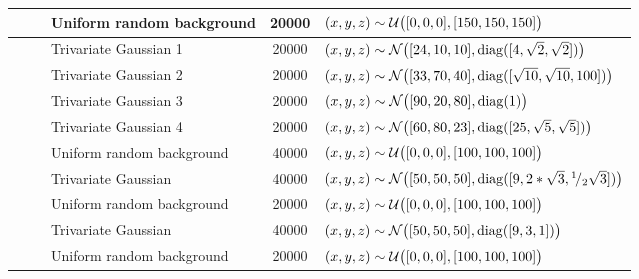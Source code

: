 \begin{tabular}{@{}cclS[table-format=+1.1e+1,scientific-notation=true,round-mode=places,round-precision=1]l@{}}
~ 				&\legendComponentNoise	& Uniform random background	& 20000		& $(x, y, z) \sim \mathcal{U}\big([0, 0, 0], [150, 150, 150]\big)$\\
\hline
\baakmanThree	&\legendComponentOne 	& Trivariate Gaussian 1 	& 20000		& $(x, y, z) \sim \mathcal{N}\big([24, 10, 10], \operatorname{diag}([4, \sqrt{2}, \sqrt{2}])\big)$\\
~ 				&\legendComponentTwo	& Trivariate Gaussian 2 	& 20000		& $(x, y, z) \sim \mathcal{N}\big([33, 70, 40], \operatorname{diag}([\sqrt{10}, \sqrt{10}, 100])\big)$\\
~ 				&\legendComponentThree	& Trivariate Gaussian 3 	& 20000		& $(x, y, z) \sim \mathcal{N}\big([90, 20, 80], \operatorname{diag}(1)\big)$\\
~ 				&\legendComponentFour	& Trivariate Gaussian 4 	& 20000		& $(x, y, z) \sim \mathcal{N}\big([60, 80, 23], \operatorname{diag}([25, \sqrt{5}, \sqrt{5}])\big)$\\
~ 				&\legendComponentNoise	& Uniform random background	& 40000		& $(x, y, z) \sim \mathcal{U}\big([0, 0, 0], [100, 100, 100]\big)$\\
\hline
\baakmanFour	&\legendComponentOne	& Trivariate Gaussian 		& 40000		& $(x, y, z) \sim \mathcal{N}\big([50, 50, 50], \operatorname{diag}([9, 2 * \sqrt{3}, {}^{1}\!/_{2} \sqrt{3}])\big)$\\
~ 				&\legendComponentNoise	& Uniform random background	& 20000		& $(x, y, z) \sim \mathcal{U}\big([0, 0, 0], [100, 100, 100]\big)$\\
\hline
\baakmanFive	&\legendComponentOne	& Trivariate Gaussian 		& 40000		& $(x, y, z) \sim \mathcal{N}\big([50, 50, 50], \operatorname{diag}([9, 3, 1])\big)$\\
~ 				&\legendComponentNoise	& Uniform random background	& 20000		& $(x, y, z) \sim \mathcal{U}\big([0, 0, 0], [100, 100, 100]\big)$\\
\bottomrule
\end{tabular}